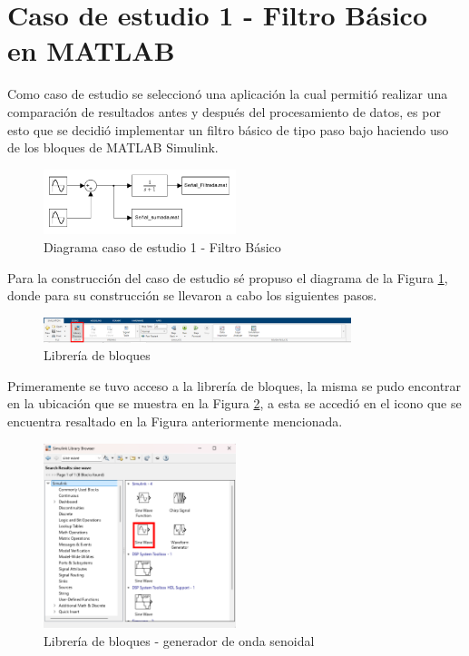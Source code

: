 \newpage

\section{Caso de estudio 1 - Filtro Básico en MATLAB}

Como caso de estudio se seleccionó una aplicación la cual permitió realizar una comparación de resultados antes y después del procesamiento de datos, es por esto que se decidió implementar un filtro básico de tipo paso bajo haciendo uso de los bloques de MATLAB Simulink. 

\begin{figure}[h!]
    \centering
    \includegraphics[width=0.5\textwidth]{fig/especifico_2/CASO_ESTUDIO_FILTRO/Diagrama matlab simulink.pdf}
    \caption{Diagrama caso de estudio 1 - Filtro Básico}
    \label{fig:diagrama_matlab_simulink}
\end{figure}

Para la construcción del caso de estudio sé propuso el diagrama de la Figura \ref{fig:diagrama_matlab_simulink}, donde para su construcción se llevaron a cabo los siguientes pasos.

\begin{figure}[h!]
    \centering
    \includegraphics[width=0.8\textwidth]{fig/especifico_2/CASO_ESTUDIO_FILTRO/libbroswer_0.pdf}
    \caption{Librería de bloques}
    \label{fig:lib_bloq}
\end{figure}

Primeramente se tuvo acceso a la librería de bloques, la misma se pudo encontrar en la ubicación que se muestra en la Figura \ref{fig:lib_bloq}, a esta se accedió en el icono que se encuentra resaltado en la Figura anteriormente mencionada.



\begin{figure}[h!]
    \centering
    \includegraphics[width=0.5\textwidth]{fig/especifico_2/CASO_ESTUDIO_FILTRO/sinewave_0.pdf}
    \caption{Librería de bloques - generador de onda senoidal}
    \label{fig:lib_bloq_sine}
\end{figure}

